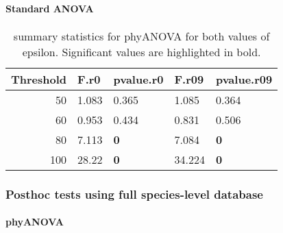 \documentclass[]{article}
\let\oldparagraph\paragraph
\renewcommand{\paragraph}[1]{\oldparagraph{#1}\mbox{}}
\begin{document}
\hypertarget{standard-anova-2}{%
\paragraph{Standard ANOVA}\label{standard-anova-2}}

\begin{table}[H]

\caption{\label{tab:unnamed-chunk-13}summary statistics for phyANOVA for both values of epsilon. Significant values are highlighted in bold.}
\centering
\begin{tabular}{r|l|l|l|l}
\hline
Threshold & F.r0 & pvalue.r0 & F.r09 & pvalue.r09\\
\hline
50 & 1.083 & 0.365 & 1.085 & 0.364\\
\hline
60 & 0.953 & 0.434 & 0.831 & 0.506\\
\hline
80 & 7.113 & \textbf{0} & 7.084 & \textbf{0}\\
\hline
100 & 28.22 & \textbf{0} & 34.224 & \textbf{0}\\
\hline
\end{tabular}
\end{table}

\hypertarget{posthoc-tests-using-full-species-level-database}{%
\subsubsection{Posthoc tests using full species-level
database}\label{posthoc-tests-using-full-species-level-database}}

\hypertarget{phyanova-3}{%
\paragraph{phyANOVA}\label{phyanova-3}}
\end{document}
